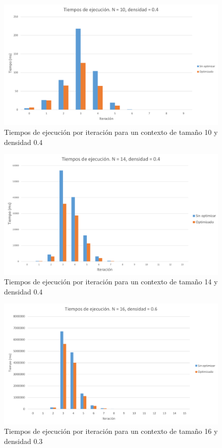 	\begin{figure}[htbp]
		\centering
		\includegraphics[width=1\linewidth]{05_Pruebas/graficas/10_4}
		\caption{Tiempos de ejecución por iteración para un contexto de tamaño 10 y densidad 0.4}
		\label{fig:10_4}
	\end{figure}

	\begin{figure}[htbp]
		\centering
		\includegraphics[width=1\linewidth]{05_Pruebas/graficas/14_4}
		\caption{Tiempos de ejecución por iteración para un contexto de tamaño 14 y densidad 0.4}
		\label{fig:14_4}
	\end{figure}
	
	\begin{figure}[htbp]
		\centering
		\includegraphics[width=1\linewidth]{05_Pruebas/graficas/16_3}
		\caption{Tiempos de ejecución por iteración para un contexto de tamaño 16 y densidad 0.3}
		\label{fig:16_3}
	\end{figure}
	
